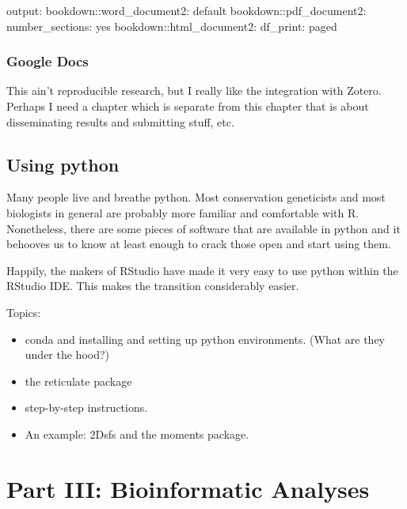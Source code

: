 \documentclass[]{krantz}
\makeatletter
\newenvironment{Shaded}{\begin{snugshade}}{\end{snugshade}}
\newcommand{\AttributeTok}[1]{\textcolor[rgb]{0.61,0.61,0.61}{#1}}
\newcommand{\FunctionTok}[1]{\textcolor[rgb]{0,0,0}{#1}}
\providecommand{\tightlist}{%
  \setlength{\itemsep}{0pt}\setlength{\parskip}{0pt}}
\newenvironment{kframe}{%
\medskip{}
\setlength{\fboxsep}{.8em}
 \def\at@end@of@kframe{}%
 \ifinner\ifhmode%
  \def\at@end@of@kframe{\end{minipage}}%
  \begin{minipage}{\columnwidth}%
 \fi\fi%
 \def\FrameCommand##1{\hskip\@totalleftmargin \hskip-\fboxsep
 \colorbox{shadecolor}{##1}\hskip-\fboxsep
     \hskip-\linewidth \hskip-\@totalleftmargin \hskip\columnwidth}%
 \MakeFramed {\advance\hsize-\width
   \@totalleftmargin\z@ \linewidth\hsize
   \@setminipage}}%
 {\par\unskip\endMakeFramed%
 \at@end@of@kframe}
\renewenvironment{Shaded}{\begin{kframe}}{\end{kframe}}
\makeatother
\begin{document}
\begin{Shaded}
\begin{Highlighting}[]
\FunctionTok{output:}
  \FunctionTok{bookdown:}\AttributeTok{:word_document2: default}
  \FunctionTok{bookdown:}\AttributeTok{:pdf_document2:}
    \FunctionTok{number_sections:}\AttributeTok{ yes}
  \FunctionTok{bookdown:}\AttributeTok{:html_document2:}
    \FunctionTok{df_print:}\AttributeTok{ paged}
\end{Highlighting}
\end{Shaded}

\hypertarget{google-docs}{%
\section{Google Docs}\label{google-docs}}

This ain't reproducible research, but I really like the integration with Zotero. Perhaps
I need a chapter which is separate from this chapter that is about disseminating results and
submitting stuff, etc.

\hypertarget{using-python}{%
\chapter{Using python}\label{using-python}}

Many people live and breathe python. Most conservation geneticists and most
biologists in general are probably more familiar and comfortable with R. Nonetheless,
there are some pieces of software that are available in python and it behooves us
to know at least enough to crack those open and start using them.

Happily, the makers of RStudio have made it very easy to use python within the
RStudio IDE. This makes the transition considerably easier.

Topics:

\begin{itemize}
\tightlist
\item
  conda and installing and setting up python environments. (What are they under
  the hood?)
\item
  the reticulate package
\item
  step-by-step instructions.
\item
  An example: 2Dsfs and the moments package.
\end{itemize}

\hypertarget{part-part-iii-bioinformatic-analyses}{%
\part{Part III: Bioinformatic Analyses}\label{part-part-iii-bioinformatic-analyses}}
\end{document}
